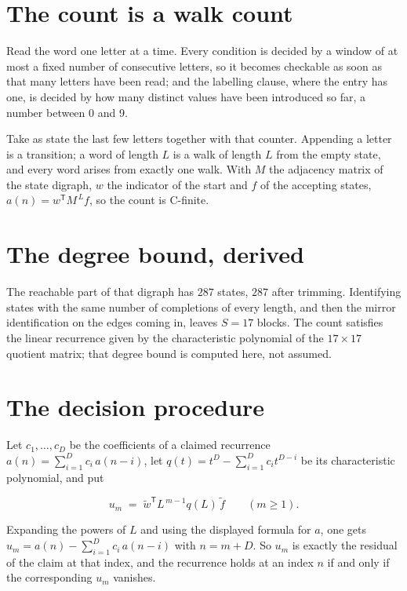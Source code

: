 \documentclass[11pt]{article}
\theoremstyle{definition}
\begin{document}
\section{The count is a walk count}

Read the word one letter at a time. Every condition is decided by a window of at most a fixed number of consecutive letters, so it becomes checkable as soon as that many letters have been read; and the labelling clause, where the entry has one, is decided by how many distinct values have been introduced so far, a number between $0$ and 9.

Take as state the last few letters together with that counter. Appending a letter is a transition; a word of length $L$ is a walk of length $L$ from the empty state, and every word arises from exactly one walk. With $M$ the adjacency matrix of the state digraph, $w$ the indicator of the start and $f$ of the accepting states, $a(n) = w^{\mathsf T}M^{\,L}f$, so the count is C-finite.

\section{The degree bound, derived}

The reachable part of that digraph has $287$ states, $287$ after trimming. Identifying states with the same number of completions of every length, and then the mirror identification on the edges coming in, leaves $S = 17$ blocks. The count satisfies the linear recurrence given by the characteristic polynomial of the $17\times17$ quotient matrix; that degree bound is computed here, not assumed.

\section{The decision procedure}

Let $c_1,\dots,c_D$ be the coefficients of a claimed recurrence $a(n) = \sum_{i=1}^{D} c_i\,a(n-i)$, let $q(t) = t^{D} - \sum_{i=1}^{D} c_i t^{D-i}$ be its characteristic polynomial, and put

\[u_m \;=\; \tilde w^{\mathsf T} L^{\,m-1} q(L)\,\tilde f \qquad (m \ge 1).\]

Expanding the powers of $L$ and using the displayed formula for $a$, one gets $u_m = a(n) - \sum_{i=1}^{D} c_i\,a(n-i)$ with $n = m + D$. So $u_m$ is exactly the residual of the claim at that index, and the recurrence holds at an index $n$ if and only if the corresponding $u_m$ vanishes.
\end{document}
